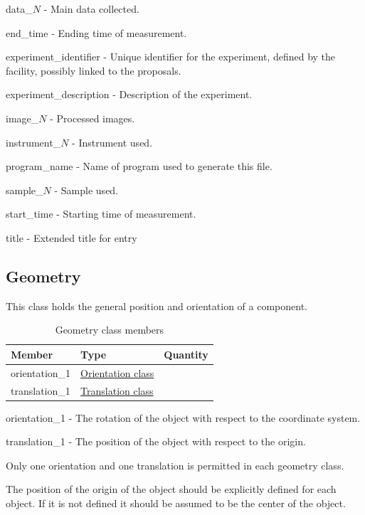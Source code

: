 \documentclass[usletter,11pt]{article}
\newcommand{\member}[2]
{ \noindent
{ \color{softBlue}  #1 - } #2
\vspace{0.2cm}
}
\begin{document}
\member{data\_$N$}{Main data collected.}

\member{end\_time}{Ending time of measurement.}

\member{experiment\_identifier}{Unique identifier for the experiment,
defined by the facility, possibly linked to the proposals.}

\member{experiment\_description}{Description of the experiment.}

\member{image\_$N$}{Processed images.}

\member{instrument\_$N$}{Instrument used.}

\member{program\_name}{Name of program used to generate this file.}

\member{sample\_$N$}{Sample used.}

\member{start\_time}{Starting time of measurement.}

\member{title}{Extended title for entry}

\subsection{Geometry}
\label{table:geometry}

This class holds the general position and orientation of a component.

\begin{table}[h!]\sffamily \footnotesize
\caption{Geometry class members}

\begin{tabular}{p{4.5cm} p{4.5cm}  p{2.5cm} }
\toprule
\bfseries Member     & \bfseries Type & \bfseries Quantity \\
\midrule

orientation\_1 & \hyperref[table:orientation]{Orientation class} & \\
translation\_1 & \hyperref[table:translation]{Translation class} &  \\

\bottomrule
\end{tabular}
\end{table}

\member{orientation\_1}{The rotation of the object with respect to the
  coordinate system.}

\member{translation\_1}{The position of the object with respect to the
origin.}

Only one orientation and one translation is permitted in each geometry
class.

The position of the origin of the object should be explicitly defined for each
object. If it is not defined it should be assumed to be the center of
the object.
\end{document}
